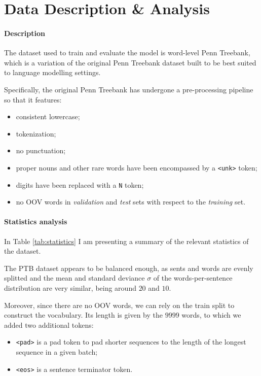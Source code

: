 \section{Data Description \& Analysis}
\label{sec:3_data}
\paragraph*{Description}
The dataset used to train and evaluate the model is word-level Penn Treebank, which is a variation of the original Penn Treebank dataset built to be best suited to language modelling settings. 

Specifically, the original Penn Treebank has undergone a pre-processing pipeline so that it features:

\begin{itemize}
    \item consistent lowercase;
    \item tokenization;
    \item no punctuation;
    \item proper nouns and other rare words have been encompassed by a \texttt{<unk>} token;
    \item digits have been replaced with a \texttt{N} token;
    \item no OOV words in \emph{validation} and \emph{test} sets with respect to the \emph{training} set.
\end{itemize}



\paragraph*{Statistics analysis}
In Table \ref{tab:statistics} I am presenting a summary of the relevant statistics of the dataset.

The PTB dataset appears to be balanced enough, as sents and words are evenly splitted and the mean and standard deviance \(\sigma\) of the words-per-sentence distribution are very similar, being around \(20\) and \(10\).

Moreover, since there are no OOV words, we can rely on the train split to construct the vocabulary. Its length is given by the \(9999\) words, to which we added two additional tokens:
\begin{itemize}
    \item \texttt{<pad>} is a pad token to pad shorter sequences to the length of the longest sequence in a given batch;
    \item \texttt{<eos>} is a sentence terminator token.
\end{itemize}

